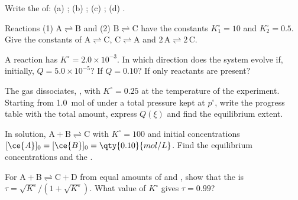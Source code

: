 \begin{exercise}[$\star$]\label{exo:b1:extent-q-and-k:4}
Write the  of: (a) ;
(b) ; (c) ; (d) .
\end{exercise}

\begin{exercise}[$\star\star$]\label{exo:b1:extent-q-and-k:5}
Reactions (1) $\mathrm{A \rightleftharpoons B}$ and (2) $\mathrm{B \rightleftharpoons C}$ have the constants
$K_1^\circ = 10$ and $K_2^\circ = 0.5$. Give the constants of $\mathrm{A \rightleftharpoons C}$,
$\mathrm{C \rightleftharpoons A}$ and $\mathrm{2\,A \rightleftharpoons 2\,C}$.
\end{exercise}

\begin{exercise}[$\star\star$]\label{exo:b1:extent-q-and-k:6}
A reaction has $K^\circ = 2.0 \times 10^{-3}$. In which direction does
the system evolve if, initially, $Q = 5.0 \times 10^{-5}$? If $Q = 0.10$?
If only reactants are present?
\end{exercise}

\begin{exercise}[$\star\star$]\label{exo:b1:extent-q-and-k:7}
The gas  dissociates, , with $K^\circ = 0.25$ at
the temperature of the experiment. Starting from \qty{1.0}{mol} of 
under a total pressure kept at $p^\circ$, write the progress table with
the total amount, express $Q(\xi)$ and find the equilibrium extent.
\end{exercise}

\begin{exercise}[$\star\star$]\label{exo:b1:extent-q-and-k:8}
In solution, $\mathrm{A + B \rightleftharpoons C}$ with $K^\circ = 100$ and initial
concentrations $[\ce{A}]_0 = [\ce{B}]_0 = \qty{0.10}{mol/L}$. Find the
equilibrium concentrations and the .
\end{exercise}

\begin{exercise}[$\star\star$]\label{exo:b1:extent-q-and-k:9}
For $\mathrm{A + B \rightleftharpoons C + D}$ from equal amounts of  and , show that
the  is $\tau = \sqrt{K^\circ}/(1 + \sqrt{K^\circ})$.
What value of $K^\circ$ gives $\tau = 0.99$?
\end{exercise}

